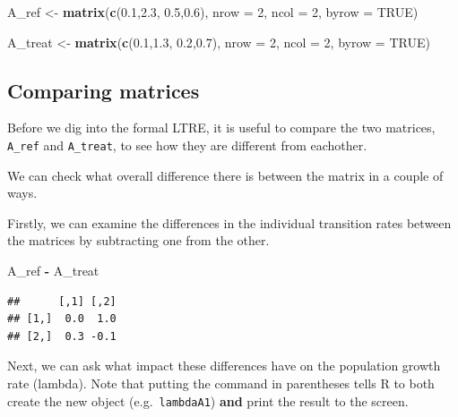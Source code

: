 \documentclass[
  a4paper]{book}
\newenvironment{Shaded}{\begin{snugshade}}{\end{snugshade}}
\newcommand{\AttributeTok}[1]{\textcolor[rgb]{0.13,0.29,0.53}{#1}}
\newcommand{\ConstantTok}[1]{\textcolor[rgb]{0.56,0.35,0.01}{#1}}
\newcommand{\DecValTok}[1]{\textcolor[rgb]{0.00,0.00,0.81}{#1}}
\newcommand{\FloatTok}[1]{\textcolor[rgb]{0.00,0.00,0.81}{#1}}
\newcommand{\FunctionTok}[1]{\textcolor[rgb]{0.13,0.29,0.53}{\textbf{#1}}}
\newcommand{\NormalTok}[1]{#1}
\newcommand{\OtherTok}[1]{\textcolor[rgb]{0.56,0.35,0.01}{#1}}
\newcommand{\SpecialCharTok}[1]{\textcolor[rgb]{0.81,0.36,0.00}{\textbf{#1}}}
\begin{document}
\begin{Shaded}
\begin{Highlighting}[]
\NormalTok{A\_ref }\OtherTok{\textless{}{-}} \FunctionTok{matrix}\NormalTok{(}\FunctionTok{c}\NormalTok{(}\FloatTok{0.1}\NormalTok{,}\FloatTok{2.3}\NormalTok{,}
                  \FloatTok{0.5}\NormalTok{,}\FloatTok{0.6}\NormalTok{), }\AttributeTok{nrow =} \DecValTok{2}\NormalTok{, }\AttributeTok{ncol =} \DecValTok{2}\NormalTok{, }\AttributeTok{byrow =} \ConstantTok{TRUE}\NormalTok{)}

\NormalTok{A\_treat }\OtherTok{\textless{}{-}} \FunctionTok{matrix}\NormalTok{(}\FunctionTok{c}\NormalTok{(}\FloatTok{0.1}\NormalTok{,}\FloatTok{1.3}\NormalTok{,}
                    \FloatTok{0.2}\NormalTok{,}\FloatTok{0.7}\NormalTok{), }\AttributeTok{nrow =} \DecValTok{2}\NormalTok{, }\AttributeTok{ncol =} \DecValTok{2}\NormalTok{, }\AttributeTok{byrow =} \ConstantTok{TRUE}\NormalTok{)}
\end{Highlighting}
\end{Shaded}

\subsection{Comparing matrices}\label{comparing-matrices}

Before we dig into the formal LTRE, it is useful to compare the two matrices, \texttt{A\_ref} and \texttt{A\_treat}, to see how they are different from eachother.

We can check what overall difference there is between the matrix in a couple of ways.

Firstly, we can examine the differences in the individual transition rates between the matrices by subtracting one from the other.

\begin{Shaded}
\begin{Highlighting}[]
\NormalTok{A\_ref }\SpecialCharTok{{-}}\NormalTok{ A\_treat}
\end{Highlighting}
\end{Shaded}

\begin{verbatim}
##      [,1] [,2]
## [1,]  0.0  1.0
## [2,]  0.3 -0.1
\end{verbatim}

Next, we can ask what impact these differences have on the population growth rate (lambda).
Note that putting the command in parentheses tells R to both create the new object (e.g.~\texttt{lambdaA1}) \textbf{and} print the result to the screen.
\end{document}
